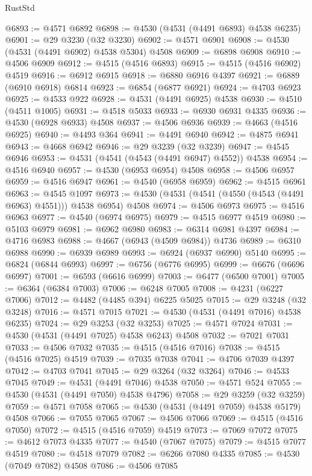 \begin{lexlean}{RustStd}
\begin{coremodule}
@6893 := @4571 @6892
@6898 := @4530 (@4531 (@4491 @6893) @4538 @6235)
@6901 := @29 @3230 (@32 @3230)
@6902 := @4571 @6901
@6908 := @4530 (@4531 (@4491 @6902) @4538 @5304) @4508
@6909 := @6898 @6908
@6910 := @4506 @6909
@6912 := @4515 (@4516 @6893)
@6915 := @4515 (@4516 @6902) @4519
@6916 := @6912 @6915
@6918 := @6880 @6916 @4397
@6921 := @6889 (@6910 @6918) @6814
@6923 := @6854 (@6877 @6921)
@6924 := @4703 @6923
@6925 := @4533 @922
@6928 := @4531 (@4491 @6925) @4538
@6930 := @4510 (@4511 @1005)
@6931 := @4518 @5033
@6933 := @6930 @6931 @4335
@6936 := @4530 (@6928 @6933) @4508
@6937 := @4506 @6936
@6939 := @4663 (@4516 @6925)
@6940 := @4493 @364
@6941 := @4491 @6940
@6942 := @4875 @6941
@6943 := @4668 @6942
@6946 := @29 @3239 (@32 @3239)
@6947 := @4545 @6946
@6953 := @4531 (@4541 (@4543 (@4491 @6947) @4552)) @4538
@6954 := @4516 @6940
@6957 := @4530 (@6953 @6954) @4508
@6958 := @4506 @6957
@6959 := @4516 @6947
@6961 := @4540 (@6958 @6959)
@6962 := @4515 @6961
@6963 := @4545 @1097
@6973 := @4530 (@4531 (@4541 (@4550 (@4543 (@4491 @6963) @4551))) @4538 @6954) @4508
@6974 := @4506 @6973
@6975 := @4516 @6963
@6977 := @4540 (@6974 @6975)
@6979 := @4515 @6977 @4519
@6980 := @5103 @6979
@6981 := @6962 @6980
@6983 := @6314 @6981 @4397
@6984 := @4716 @6983
@6988 := @4667 (@6943 (@4509 @6984)) @4736
@6989 := @6310 @6988
@6990 := @6939 @6989
@6993 := @6924 (@6937 @6990) @5140
@6995 := @6824 (@6844 @6993)
@6997 := @6756 (@6776 @6995)
@6999 := @6676 (@6696 @6997)
@7001 := @6593 (@6616 @6999)
@7003 := @6477 (@6500 @7001)
@7005 := @6364 (@6384 @7003)
@7006 := @6248 @7005
@7008 := @4231 (@6227 @7006)
@7012 := @4482 (@4485 @394) @6225 @5025
@7015 := @29 @3248 (@32 @3248)
@7016 := @4571 @7015
@7021 := @4530 (@4531 (@4491 @7016) @4538 @6235)
@7024 := @29 @3253 (@32 @3253)
@7025 := @4571 @7024
@7031 := @4530 (@4531 (@4491 @7025) @4538 @6243) @4508
@7032 := @7021 @7031
@7033 := @4506 @7032
@7035 := @4515 (@4516 @7016)
@7038 := @4515 (@4516 @7025) @4519
@7039 := @7035 @7038
@7041 := @4706 @7039 @4397
@7042 := @4703 @7041
@7045 := @29 @3264 (@32 @3264)
@7046 := @4533 @7045
@7049 := @4531 (@4491 @7046) @4538
@7050 := @4571 @524
@7055 := @4530 (@4531 (@4491 @7050) @4538 @4796)
@7058 := @29 @3259 (@32 @3259)
@7059 := @4571 @7058
@7065 := @4530 (@4531 (@4491 @7059) @4538 @5179) @4508
@7066 := @7055 @7065
@7067 := @4506 @7066
@7069 := @4515 (@4516 @7050)
@7072 := @4515 (@4516 @7059) @4519
@7073 := @7069 @7072
@7075 := @4612 @7073 @4335
@7077 := @4540 (@7067 @7075)
@7079 := @4515 @7077 @4519
@7080 := @4518 @7079
@7082 := @6266 @7080 @4335
@7085 := @4530 (@7049 @7082) @4508
@7086 := @4506 @7085

\end{coremodule}
\end{lexlean}
